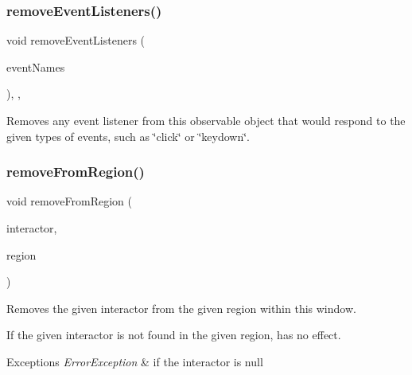 \subsubsection{\texorpdfstring{remove\+Event\+Listeners()}{removeEventListeners()}}
{\footnotesize\ttfamily void remove\+Event\+Listeners (\begin{DoxyParamCaption}\item[{std\+::initializer\+\_\+list$<$ std\+::string $>$}]{event\+Names }\end{DoxyParamCaption})\hspace{0.3cm}{\ttfamily [protected]}, {\ttfamily [virtual]}, {\ttfamily [inherited]}}



Removes any event listener from this observable object that would respond to the given types of events, such as \char`\"{}click\char`\"{} or \char`\"{}keydown\char`\"{}. 

\mbox{\label{classGWindow_a87a74b040025878283ba685e30d5104f}} 
\subsubsection{\texorpdfstring{remove\+From\+Region()}{removeFromRegion()}\hspace{0.1cm}{\footnotesize\ttfamily [1/4]}}
{\footnotesize\ttfamily void remove\+From\+Region (\begin{DoxyParamCaption}\item[{\mbox{\hyperlink{classGInteractor}{G\+Interactor}} $\ast$}]{interactor,  }\item[{\mbox{\hyperlink{classGWindow_a81a01a86de31071a92e6cce0bab9bc4b}{Region}}}]{region }\end{DoxyParamCaption})\hspace{0.3cm}{\ttfamily [virtual]}}



Removes the given interactor from the given region within this window. 

If the given interactor is not found in the given region, has no effect. 
\begin{DoxyExceptions}{Exceptions}
{\em Error\+Exception} & if the interactor is null \\
\hline
\end{DoxyExceptions}
\mbox{\label{classGWindow_a16268c8344a5a5d9b10bde95764112d1}} 

